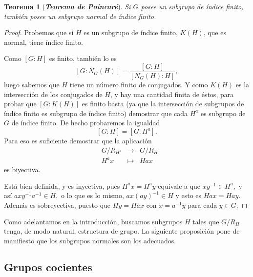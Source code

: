 \documentclass[12pt]{article}
\newtheorem{theorem}{Teorema}[section]
\begin{document}
\begin{theorem}[\textbf{\textit{Teorema de Poincaré}}]
Si $G$ posee un subgrupo de índice finito, también posee un subgrupo normal de índice finito.
\end{theorem}
\begin{proof}
Probemos que si $H$ es un subgrupo de índice finito, $K(H)$, que es normal, tiene índice finito.

Como $\left[ G:H \right]$ es finito, también lo es $$\left[ G:N_{G}(H) \right] = \frac{\left[ G:H \right]}{\left[ N_{G}(H):H \right]},$$ luego sabemos que $H$ tiene un número finito de conjugados. Y como $K(H)$ es la intersección de los conjugados de $H$, y hay una cantidad finita de éstos, para probar que $\left[ G:K(H) \right]$ es finito basta (ya que la intersección de subgrupos de índice finito es subgrupo de índice finito) demostrar que cada $H^{a}$ es subgrupo de $G$ de índice finito. De hecho probaremos la igualdad $$\left[ G:H \right] = \left[ G:H^{a} \right].$$ Para eso es suficiente demostrar que la aplicación $$
\begin{array}{rccl}
&G/R_{H^{a}} & \longrightarrow & G/R_{H}\\
&H^{a}x & \longmapsto &Hax
\end{array}
$$ es biyectiva.


Está bien definida, y es inyectiva, pues $H^{a}x = H^{a}y$ equivale a que $xy^{-1} \in H^{a},$ y así $axy^{-1}a^{-1} \in H,$ o lo que es lo mismo, $ax(ay)^{-1} \in H$ y esto es $Hax = Hay.$ Además es sobreyectiva, puesto que $Hy = Hax$ con $x=a^{-1}y$ para cada $y \in G.$

\end{proof}

Como adelantamos en la introducción, buscamos subgrupos $H$ tales que $G/R_H$ tenga, de modo natural, estructura de grupo. La siguiente proposición pone de manifiesto que los subgrupos normales son los adecuados.

\subsection{Grupos cocientes}
\end{document}

